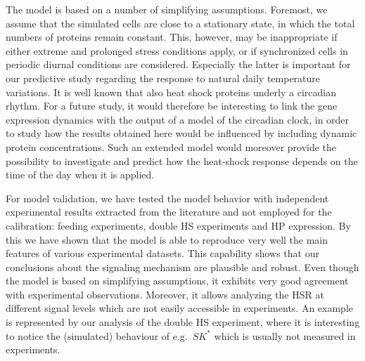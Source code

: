 \documentclass[oneside, 10pt, a4paper, twocolumn]{article}
\begin{document}
{The model is based on a number of simplifying assumptions. Foremost, we assume that the simulated cells are close 
to a stationary state, in which the total numbers of proteins remain constant. This, however, may be inappropriate if either 
extreme and prolonged stress conditions apply, or if synchronized cells in periodic diurnal conditions are considered. 
Especially the latter is important for our predictive study regarding the response to natural daily temperature variations. 
It is well known that also heat shock proteins underly a circadian rhythm. For a future study, 
it would therefore be interesting to link the gene expression
dynamics with the output of a model of the circadian clock, in order to study how the results obtained here would be influenced by 
including dynamic protein concentrations. Such an extended model would moreover provide the possibility to investigate and predict
how the heat-shock response depends on the time of the day when it is applied.}

For model validation,  we have tested the model behavior with independent experimental results extracted from the literature and not employed for the calibration: 
feeding experiments, %
double HS experiments and %
HP expression. %
By this we have shown that the model is able to reproduce very well the main features of various experimental datasets. This capability shows that our conclusions about the signaling mechanism are plausible and robust.
{Even though} the model is based on simplifying assumptions, it exhibits very good agreement with experimental observations. {Moreover, it allows analyzing the HSR at different signal levels which are not easily accessible in experiments. An example is represented by our analysis of the double HS experiment, where it is interesting to notice the (simulated) behaviour of e.g.~$SK^*$ which is usually not measured in experiments.} 
\end{document}

